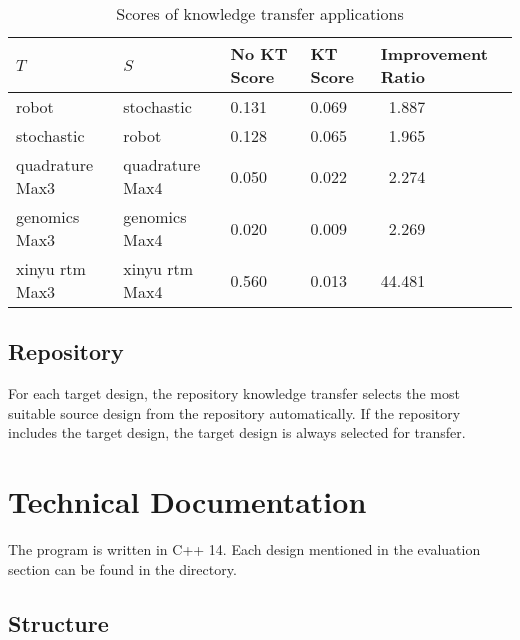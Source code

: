\documentclass[10pt,a4paper]{article}
\begin{document}
\begin{table}[H]
	\begin{tabularx}{\linewidth}{X X X X X}
		\hline
		$T$ & $S$ & No KT Score & KT Score & Improvement Ratio\\
		\hline
		robot & stochastic & 0.131 & 0.069 & $\phantom{0}$1.887\\
		stochastic & robot & 0.128 & 0.065 & $\phantom{0}$1.965\\
		quadrature Max3 & quadrature Max4 & 0.050 & 0.022 & $\phantom{0}$2.274\\
		genomics Max3 & genomics Max4 & 0.020 & 0.009 & $\phantom{0}$2.269\\
		xinyu rtm Max3 & xinyu rtm Max4 & 0.560 & 0.013 & 44.481\\
		\hline
	\end{tabularx}
	\caption{Scores of knowledge transfer applications}
\end{table}

\subsection{Repository}

For each target design, the repository knowledge transfer selects the most suitable source design from the repository automatically. If the repository includes the target design, the target design is always selected for transfer.
\section{Technical Documentation}

The program is written in C++ 14. Each design mentioned in the evaluation section can be found in the  directory.

\subsection{Structure}
\end{document}
